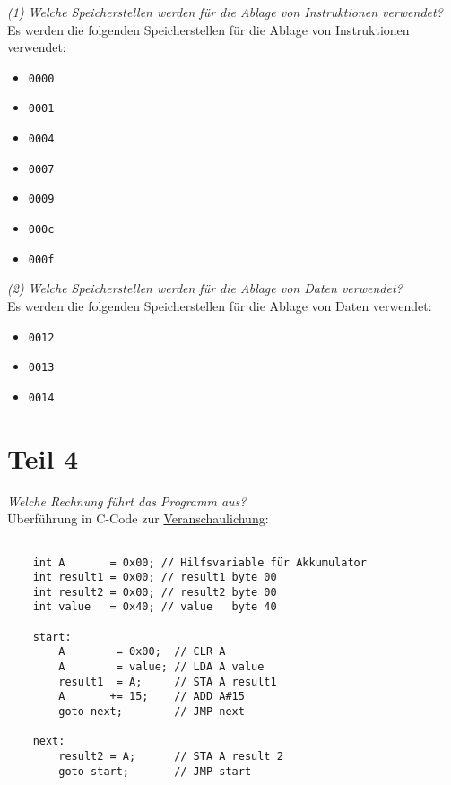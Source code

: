 \textit{(1) Welche Speicherstellen werden für die Ablage von Instruktionen verwendet?}\\

\noindent
Es werden die folgenden Speicherstellen für die Ablage von Instruktionen verwendet:

\begin{itemize}
    \itemsep0.5em
    \item \texttt{0000}
    \item \texttt{0001}
    \item \texttt{0004}
    \item \texttt{0007}
    \item \texttt{0009}
    \item \texttt{000c}
    \item \texttt{000f}
\end{itemize}

\vspace{5mm}

\noindent
\textit{(2) Welche Speicherstellen werden für die Ablage von Daten verwendet?}\\

\noindent
Es werden die folgenden Speicherstellen für die Ablage von Daten verwendet:

\begin{itemize}
    \itemsep0.5em
    \item \texttt{0012}
    \item \texttt{0013}
    \item \texttt{0014}
\end{itemize}

\section{Teil 4}

\noindent
\textit{Welche Rechnung führt das Programm aus?}\\

\noindent
Überführung in C-Code zur \underline{Veranschaulichung}:

\begin{verbatim}

    int A       = 0x00; // Hilfsvariable für Akkumulator
    int result1 = 0x00; // result1 byte 00
    int result2 = 0x00; // result2 byte 00
    int value   = 0x40; // value   byte 40

    start:
        A        = 0x00;  // CLR A
        A        = value; // LDA A value
        result1  = A;     // STA A result1
        A       += 15;    // ADD A#15
        goto next;        // JMP next

    next:
        result2 = A;      // STA A result 2
        goto start;       // JMP start
\end{verbatim}\\

